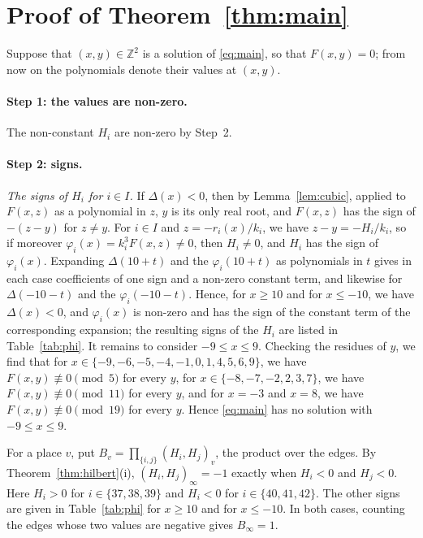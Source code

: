 \documentclass[11pt]{article}
\newcommand{\Z}{\mathbb{Z}}
\begin{document}
\section{Proof of Theorem~\ref{thm:main}}

Suppose that $(x,y)\in\Z^2$ is a solution of \eqref{eq:main}, so that $F(x,y)=0$; from now on the polynomials denote their values at $(x,y)$.
\paragraph{Step 1: the values are non-zero.} The non-constant $H_i$ are non-zero by Step~2.

\paragraph{Step 2: signs.} \emph{The signs of $H_i$ for $i\in I$.} If $\Delta(x)<0$, then by Lemma~\ref{lem:cubic}, applied to $F(x,z)$ as a polynomial in $z$, $y$ is its only real root, and $F(x,z)$ has the sign of $-(z-y)$ for $z\neq y$. For $i\in I$ and $z=-r_i(x)/k_i$, we have $z-y=-H_i/k_i$, so if moreover $\varphi_i(x)=k_i^3F(x,z)\neq0$, then $H_i\neq0$, and $H_i$ has the sign of $\varphi_i(x)$. Expanding $\Delta(10+t)$ and the $\varphi_i(10+t)$ as polynomials in $t$ gives in each case coefficients of one sign and a non-zero constant term, and likewise for $\Delta(-10-t)$ and the $\varphi_i(-10-t)$. Hence, for $x\geq10$ and for $x\leq-10$, we have $\Delta(x)<0$, and $\varphi_i(x)$ is non-zero and has the sign of the constant term of the corresponding expansion; the resulting signs of the $H_i$ are listed in Table~\ref{tab:phi}. It remains to consider $-9\leq x\leq9$. Checking the residues of $y$, we find that for $x\in\{-9,\allowbreak -6,\allowbreak -5,\allowbreak -4,\allowbreak -1,\allowbreak 0,\allowbreak 1,\allowbreak 4,\allowbreak 5,\allowbreak 6,\allowbreak 9\}$, we have $F(x,y)\not\equiv0\pmod{5}$ for every $y$, for $x\in\{-8,\allowbreak -7,\allowbreak -2,\allowbreak 2,\allowbreak 3,\allowbreak 7\}$, we have $F(x,y)\not\equiv0\pmod{11}$ for every $y$, and for $x=-3$ and $x=8$, we have $F(x,y)\not\equiv0\pmod{19}$ for every $y$. Hence \eqref{eq:main} has no solution with $-9\leq x\leq9$.

For a place $v$, put $B_v=\prod_{\{i,j\}}(H_i,H_j)_v$, the product over the edges. By Theorem~\ref{thm:hilbert}(i), $(H_i,H_j)_\infty=-1$ exactly when $H_i<0$ and $H_j<0$. Here $H_i>0$ for $i\in\{37,\allowbreak 38,\allowbreak 39\}$ and $H_i<0$ for $i\in\{40,\allowbreak 41,\allowbreak 42\}$. The other signs are given in Table~\ref{tab:phi} for $x\geq10$ and for $x\leq-10$. In both cases, counting the edges whose two values are negative gives $B_\infty=1$.
\end{document}

